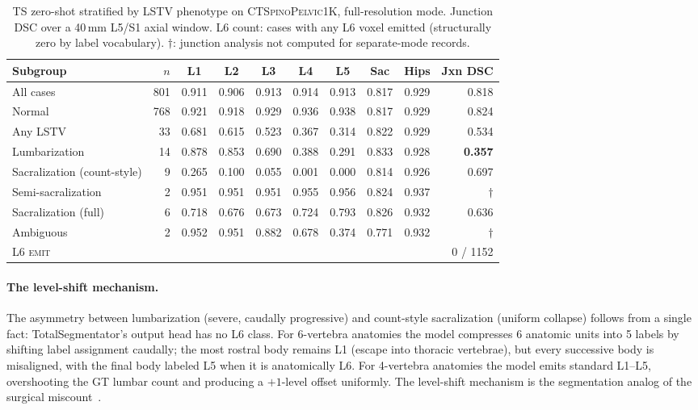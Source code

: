 \documentclass{article}
\newcommand{\dataset}{\textsc{CTSpinoPelvic1K}}
\newcommand{\SOTA}{TotalSegmentator}
\newcommand{\sota}{TS}
\begin{document}
\begin{table}[t]
\caption{\sota{} zero-shot stratified by LSTV phenotype on
\dataset{}, full-resolution mode. Junction DSC over a
40\,mm L5/S1 axial window. \textsc{L6} count: cases with
any L6 voxel emitted (structurally zero by label
vocabulary). $\dagger$: junction analysis not computed for
separate-mode records.}
\label{tab:sota_stratified}
\centering
\small
\begin{tabular}{lrcccccccr}
\toprule
\bfseries Subgroup & \bfseries $n$ &
\bfseries L1 & \bfseries L2 & \bfseries L3 & \bfseries L4 & \bfseries L5 &
\bfseries Sac & \bfseries Hips &
\bfseries Jxn DSC \\
\midrule
All cases                              & 801 & 0.911 & 0.906 & 0.913 & 0.914 & 0.913 & 0.817 & 0.929 & 0.818 \\
Normal                                 & 768 & 0.921 & 0.918 & 0.929 & 0.936 & 0.938 & 0.817 & 0.929 & 0.824 \\
\midrule
Any LSTV                               & 33  & 0.681 & 0.615 & 0.523 & 0.367 & 0.314 & 0.822 & 0.929 & 0.534 \\
\quad Lumbarization                    & 14  & 0.878 & 0.853 & 0.690 & 0.388 & 0.291 & 0.833 & 0.928 & \textbf{0.357} \\
\quad Sacralization (count-style)      &  9  & 0.265 & 0.100 & 0.055 & 0.001 & 0.000 & 0.814 & 0.926 & 0.697 \\
\quad Semi-sacralization               &  2  & 0.951 & 0.951 & 0.951 & 0.955 & 0.956 & 0.824 & 0.937 & $\dagger$ \\
\quad Sacralization (full)             &  6  & 0.718 & 0.676 & 0.673 & 0.724 & 0.793 & 0.826 & 0.932 & 0.636 \\
\quad Ambiguous                        &  2  & 0.952 & 0.951 & 0.882 & 0.678 & 0.374 & 0.771 & 0.932 & $\dagger$ \\
\midrule
\textsc{L6 emit}                       &     &       &       &       &       &       &       &       & 0 / 1152 \\
\bottomrule
\end{tabular}
\end{table}

\paragraph{The level-shift mechanism.}
The asymmetry between lumbarization (severe, caudally
progressive) and count-style sacralization (uniform
collapse) follows from a single fact: \SOTA{}'s output head
has no L6 class. For 6-vertebra anatomies the model
compresses 6 anatomic units into 5 labels by shifting label
assignment caudally; the most rostral body remains L1
(escape into thoracic vertebrae), but every successive body
is misaligned, with the final body labeled L5 when it is
anatomically L6. For 4-vertebra anatomies the model emits
standard L1--L5, overshooting the GT lumbar count and
producing a $+1$-level offset uniformly. The level-shift
mechanism is the segmentation analog of the surgical
miscount~\citep{Konin2010LumbosacralRelevance}.
\end{document}

